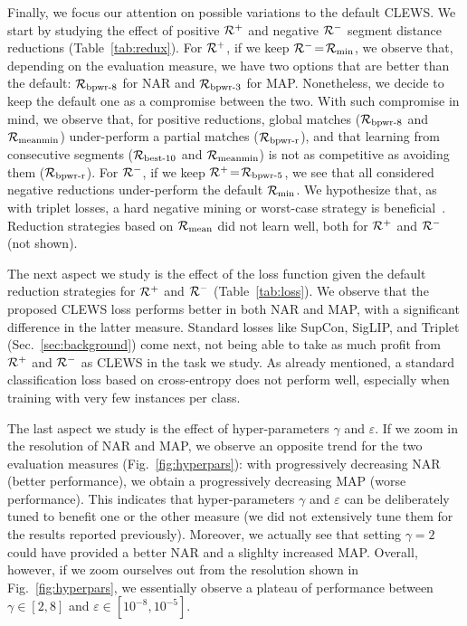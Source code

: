 Finally, we focus our attention on possible variations to the default CLEWS. We start by studying the effect of positive $\mathcal{R}^+$ and negative $\mathcal{R}^-$ segment distance reductions (Table~\ref{tab:redux}). For $\mathcal{R}^+$, if we keep $\mathcal{R}^-\!=\!\mathcal{R}_{\text{min}}$, we observe that, depending on the evaluation measure, we have two options that are better than the default: $\mathcal{R}_{\text{bpwr-8}}$ for NAR and $\mathcal{R}_{\text{bpwr-3}}$ for MAP. Nonetheless, we decide to keep the default one as a compromise between the two. With such compromise in mind, we observe that, for positive reductions, global matches ($\mathcal{R}_{\text{bpwr-8}}$ and $\mathcal{R}_{\text{meanmin}}$) under-perform a partial matches ($\mathcal{R}_{\text{bpwr-r}}$), and that learning from consecutive segments ($\mathcal{R}_{\text{best-10}}$ and $\mathcal{R}_{\text{meanmin}}$) is not as competitive as avoiding them ($\mathcal{R}_{\text{bpwr-r}}$). For $\mathcal{R}^-$, if we keep $\mathcal{R}^+\!=\!\mathcal{R}_{\text{bpwr-5}}$, we see that all considered negative reductions under-perform the default $\mathcal{R}_{\text{min}}$. We hypothesize that, as with triplet losses, a hard negative mining or worst-case strategy is beneficial~\citep[cf.][]{schroff_facenet_2015, kalantidis_hard_2020}. Reduction strategies based on $\mathcal{R}_{\text{mean}}$ did not learn well, both for $\mathcal{R}^+$ and $\mathcal{R}^-$ (not shown).

The next aspect we study is the effect of the loss function given the default reduction strategies for $\mathcal{R}^+$ and $\mathcal{R}^-$ (Table~\ref{tab:loss}). We observe that the proposed CLEWS loss performs better in both NAR and MAP, with a significant difference in the latter measure. Standard losses like SupCon, SigLIP, and Triplet (Sec.~\ref{sec:background}) come next, not being able to take as much profit from $\mathcal{R}^+$ and $\mathcal{R}^-$ as CLEWS in the task we study. As already mentioned, a standard classification loss based on cross-entropy does not perform well, especially when training with very few instances per class.

The last aspect we study is the effect of hyper-parameters $\gamma$ and $\varepsilon$. If we zoom in the resolution of NAR and MAP, we observe an opposite trend for the two evaluation measures (Fig.~\ref{fig:hyperpars}): with progressively decreasing NAR (better performance), we obtain a progressively decreasing MAP (worse performance). This indicates that hyper-parameters $\gamma$ and $\varepsilon$ can be deliberately tuned to benefit one or the other measure (we did not extensively tune them for the results reported previously). Moreover, we actually see that setting $\gamma=2$ could have provided a better NAR and a slighlty increased MAP. Overall, however, if we zoom ourselves out from the resolution shown in Fig.~\ref{fig:hyperpars}, we essentially observe a plateau of performance between $\gamma\in[2,8]$ and $\varepsilon\in[10^{-8},10^{-5}]$.

